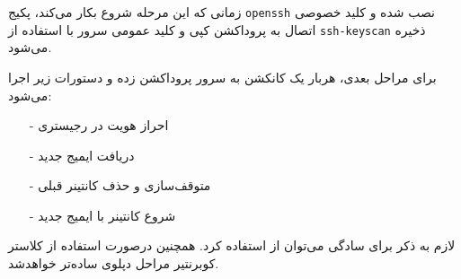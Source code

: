 زمانی که این مرحله شروع بکار می‌کند، پکیج
\texttt{openssh}
نصب شده و کلید خصوصی اتصال به پروداکشن کپی و کلید عمومی سرور
با استفاده از 
\texttt{ssh-keyscan}
 ذخیره می‌شود.
 
برای مراحل بعدی، هربار یک کانکشن
به سرور پروداکشن زده  و دستورات زیر اجرا می‌شود:
\begin{itemize}
\item[-]
احراز هویت در رجیستری
\item[-]
دریافت ایمیج جدید
\item[-]
متوقف‌سازی و حذف کانتینر قبلی
\item[-]
شروع کانتینر با ایمیج جدید
\end{itemize}

لازم به ذکر برای سادگی می‌توان از 
استفاده کرد. همچنین درصورت استفاده از کلاستر کوبرنتیر مراحل دپلوی ساده‌تر خواهدشد.










